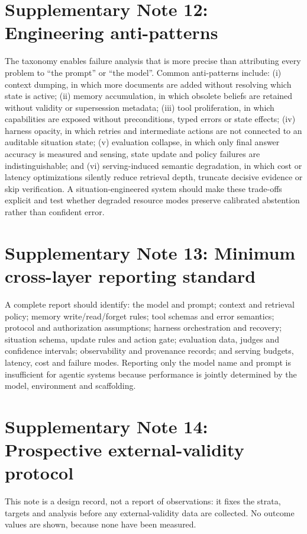 \documentclass[Numbered]{sn-jnl}
\begin{document}
\section*{Supplementary Note 12: Engineering anti-patterns}
The taxonomy enables failure analysis that is more precise than attributing every
problem to ``the prompt'' or ``the model''. Common anti-patterns include:
(i) context dumping, in which more documents are added without resolving which
state is active; (ii) memory accumulation, in which obsolete beliefs are retained
without validity or supersession metadata; (iii) tool proliferation, in which
capabilities are exposed without preconditions, typed errors or state effects;
(iv) harness opacity, in which retries and intermediate actions are not connected
to an auditable situation state; (v) evaluation collapse, in which only final
answer accuracy is measured and sensing, state update and policy failures are
indistinguishable; and (vi) serving-induced semantic degradation, in which cost
or latency optimizations silently reduce retrieval depth, truncate decisive
evidence or skip verification. A situation-engineered system should make these
trade-offs explicit and test whether degraded resource modes preserve calibrated
abstention rather than confident error.

\section*{Supplementary Note 13: Minimum cross-layer reporting standard}
A complete report should identify: the model and prompt; context and retrieval
policy; memory write/read/forget rules; tool schemas and error semantics;
protocol and authorization assumptions; harness orchestration and recovery;
situation schema, update rules and action gate; evaluation data, judges and
confidence intervals; observability and provenance records; and serving budgets,
latency, cost and failure modes. Reporting only the model name and prompt is
insufficient for agentic systems because performance is jointly determined by
the model, environment and scaffolding.

\section*{Supplementary Note 14: Prospective external-validity protocol}
This note is a design record, not a report of observations: it fixes the
strata, targets and analysis before any external-validity data are collected.
No outcome values are shown, because none have been measured.
\end{document}
